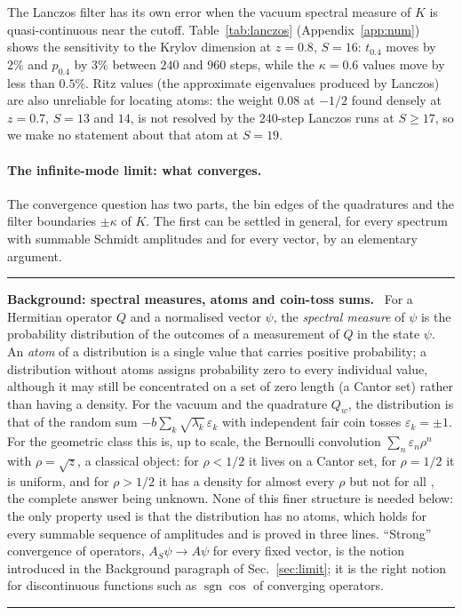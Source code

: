 \documentclass[11pt,a4paper]{article}
\newcommand{\sgn}{\operatorname{sgn}}
\newenvironment{background}[1]{\par\medskip\noindent\hrule\smallskip\noindent\textbf{Background: #1.}\ \ignorespaces}{\par\smallskip\noindent\hrule\medskip}
\begin{document}
The Lanczos filter has its own error when the vacuum spectral measure of $K$ is quasi-continuous near the cutoff. Table~\ref{tab:lanczos} (Appendix~\ref{app:num}) shows the sensitivity to the Krylov dimension at $z=0.8$, $S=16$: $t_{0.4}$ moves by $2\%$ and $p_{0.4}$ by $3\%$ between $240$ and $960$ steps, while the $\kappa=0.6$ values move by less than $0.5\%$. Ritz values (the approximate eigenvalues produced by Lanczos) are also unreliable for locating atoms: the weight $0.08$ at $-1/2$ found densely at $z=0.7$, $S=13$ and $14$, is not resolved by the $240$-step Lanczos runs at $S\ge17$, so we make no statement about that atom at $S=19$.

\paragraph{The infinite-mode limit: what converges.}
The convergence question has two parts, the bin edges of the quadratures and the filter boundaries $\pm\kappa$ of $K$. The first can be settled in general, for every spectrum with summable Schmidt amplitudes and for every vector, by an elementary argument.
\begin{background}{spectral measures, atoms and coin-toss sums}
For a Hermitian operator $Q$ and a normalised vector $\psi$, the \emph{spectral measure} of $\psi$ is the probability distribution of the outcomes of a measurement of $Q$ in the state $\psi$. An \emph{atom} of a distribution is a single value that carries positive probability; a distribution without atoms assigns probability zero to every individual value, although it may still be concentrated on a set of zero length (a Cantor set) rather than having a density. For the vacuum and the quadrature $Q_w$, the distribution is that of the random sum $-b\sum_k\sqrt{\lambda_k}\,\varepsilon_k$ with independent fair coin tosses $\varepsilon_k=\pm1$. For the geometric class this is, up to scale, the Bernoulli convolution $\sum_n\varepsilon_n\rho^n$ with $\rho=\sqrt z$, a classical object: for $\rho<1/2$ it lives on a Cantor set, for $\rho=1/2$ it is uniform, and for $\rho>1/2$ it has a density for almost every $\rho$ \cite{Solomyak1995,Shmerkin2014} but not for all \cite{Erdos1939}, the complete answer being unknown. None of this finer structure is needed below: the only property used is that the distribution has no atoms, which holds for every summable sequence of amplitudes and is proved in three lines. ``Strong'' convergence of operators, $A_S\psi\to A\psi$ for every fixed vector, is the notion introduced in the Background paragraph of Sec.~\ref{sec:limit}; it is the right notion for discontinuous functions such as $\sgn\cos$ of converging operators.
\end{background}
\end{document}
